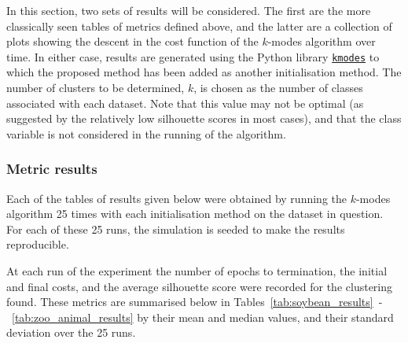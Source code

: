 In this section, two sets of results will be considered. The first are the more
classically seen tables of metrics defined above, and the latter are a
collection of plots showing the descent in the cost function of the \(k\)-modes
algorithm over time. In either case, results are generated using the Python
library \href{https://github.com/nicodv/kmodes}{\texttt{kmodes}} to which the
proposed method has been added as another initialisation method. The number of
clusters to be determined, \(k\), is chosen as the number of classes associated
with each dataset. Note that this value may not be optimal (as suggested by the
relatively low silhouette scores in most cases), and that the class variable is
not considered in the running of the algorithm.

\subsubsection{Metric results}

Each of the tables of results given below were obtained by running the
\(k\)-modes algorithm 25 times with each initialisation method on the dataset in
question. For each of these 25 runs, the simulation is seeded to make the
results reproducible.

At each run of the experiment the number of epochs to termination, the initial
and final costs, and the average silhouette score were recorded for the
clustering found. These metrics are summarised below in
Tables~\ref{tab:soybean_results}~\--~\ref{tab:zoo_animal_results} by their mean
and median values, and their standard deviation over the 25 runs.

\singlespacing%
\begin{table}[H]
    \centering
    \resizebox{.9\textwidth}{!}{%
        
    }
    \label{tab:soybean_results}\vspace{20pt}

    \resizebox{.9\textwidth}{!}{%
        
    }
    \label{tab:mushroom_results}
\end{table}

\begin{table}[H]
    \centering
    \resizebox{.9\textwidth}{!}{%
        
    }
    \label{tab:breast_cancer_results}\vspace{20pt}

    \resizebox{.9\textwidth}{!}{%
        
    }
    \label{tab:zoo_animal_results}
\end{table}
\doublespacing%

